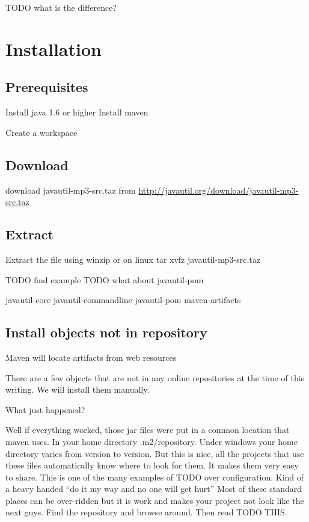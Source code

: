 \documentclass[a4paper,10pt]{book}
\begin{document}
TODO what is the difference?
\chapter{Installation}

\section{Prerequisites}
Install java 1.6 or higher
Install maven


Create a workspace

\section{Download} 
download javautil-mp3-src.taz from \url{http://javautil.org/download/javautil-mp3-src.taz} 
\section{Extract}
Extract the file using winzip or on linux 
tar xvfz javautil-mp3-src.taz

TODO find example
TODO what about javautil-pom

javautil-core
javautil-commandline
javautil-pom
maven-artifacts

\section{Install objects not in repository}
Maven will locate artifacts from web resources

There are a few objects that are not in any online repositories at the time of this writing.  We will install them manually.

\begin{program}
 
\end{program}
What just happened?

Well if everything worked, those jar files were put in a common location that maven uses.  In your home directory .m2/repository.
Under windows your home directory varies from version to version.  But this is nice, all the projects that use these files automatically know
where to look for them.  It makes them very easy to share.  This is one of the many examples of TODO over configuration.
Kind of a heavy handed ``do it my way and no one will get hurt'' Most of these standard places can be over-ridden but it is work and 
makes your project not look like the next guys.   Find the repository and browse around. Then read TODO THIS.
\end{document}
